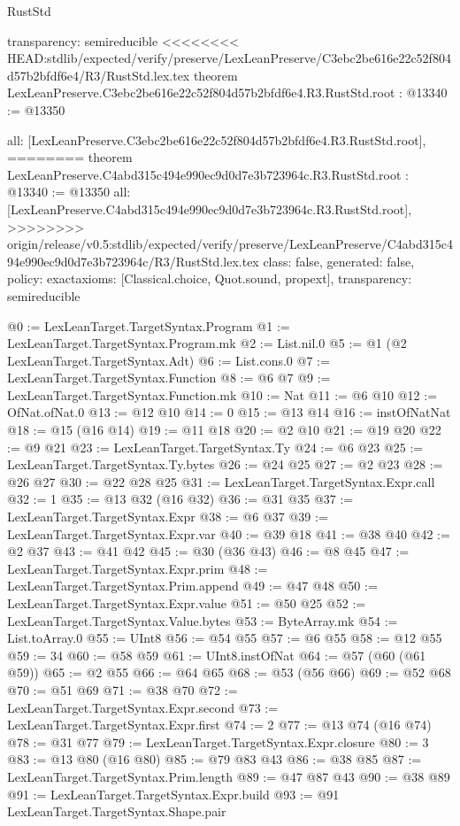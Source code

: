 \begin{lexlean}{RustStd}
\begin{coremodule}
{\begin{coremodule}
{{{{{{{{{{{{{{  transparency: semireducible
}
<<<<<<<< HEAD:stdlib/expected/verify/preserve/LexLeanPreserve/C3ebc2be616e22c52f804d57b2bfdf6e4/R3/RustStd.lex.tex
theorem LexLeanPreserve.C3ebc2be616e22c52f804d57b2bfdf6e4.R3.RustStd.root : @13340 := @13350 {
  all: [LexLeanPreserve.C3ebc2be616e22c52f804d57b2bfdf6e4.R3.RustStd.root],
========
theorem LexLeanPreserve.C4abd315c494e990ec9d0d7e3b723964c.R3.RustStd.root : @13340 := @13350 {
  all: [LexLeanPreserve.C4abd315c494e990ec9d0d7e3b723964c.R3.RustStd.root],
>>>>>>>> origin/release/v0.5:stdlib/expected/verify/preserve/LexLeanPreserve/C4abd315c494e990ec9d0d7e3b723964c/R3/RustStd.lex.tex
  class: false,
  generated: false,
  policy: exact{axioms: [Classical.choice, Quot.sound, propext]},
  transparency: semireducible
}

@0 := LexLeanTarget.TargetSyntax.Program
@1 := LexLeanTarget.TargetSyntax.Program.mk
@2 := List.nil.{0}
@5 := @1 (@2 LexLeanTarget.TargetSyntax.Adt)
@6 := List.cons.{0}
@7 := LexLeanTarget.TargetSyntax.Function
@8 := @6 @7
@9 := LexLeanTarget.TargetSyntax.Function.mk
@10 := Nat
@11 := @6 @10
@12 := OfNat.ofNat.{0}
@13 := @12 @10
@14 := 0
@15 := @13 @14
@16 := instOfNatNat
@18 := @15 (@16 @14)
@19 := @11 @18
@20 := @2 @10
@21 := @19 @20
@22 := @9 @21
@23 := LexLeanTarget.TargetSyntax.Ty
@24 := @6 @23
@25 := LexLeanTarget.TargetSyntax.Ty.bytes
@26 := @24 @25
@27 := @2 @23
@28 := @26 @27
@30 := @22 @28 @25
@31 := LexLeanTarget.TargetSyntax.Expr.call
@32 := 1
@35 := @13 @32 (@16 @32)
@36 := @31 @35
@37 := LexLeanTarget.TargetSyntax.Expr
@38 := @6 @37
@39 := LexLeanTarget.TargetSyntax.Expr.var
@40 := @39 @18
@41 := @38 @40
@42 := @2 @37
@43 := @41 @42
@45 := @30 (@36 @43)
@46 := @8 @45
@47 := LexLeanTarget.TargetSyntax.Expr.prim
@48 := LexLeanTarget.TargetSyntax.Prim.append
@49 := @47 @48
@50 := LexLeanTarget.TargetSyntax.Expr.value
@51 := @50 @25
@52 := LexLeanTarget.TargetSyntax.Value.bytes
@53 := ByteArray.mk
@54 := List.toArray.{0}
@55 := UInt8
@56 := @54 @55
@57 := @6 @55
@58 := @12 @55
@59 := 34
@60 := @58 @59
@61 := UInt8.instOfNat
@64 := @57 (@60 (@61 @59))
@65 := @2 @55
@66 := @64 @65
@68 := @53 (@56 @66)
@69 := @52 @68
@70 := @51 @69
@71 := @38 @70
@72 := LexLeanTarget.TargetSyntax.Expr.second
@73 := LexLeanTarget.TargetSyntax.Expr.first
@74 := 2
@77 := @13 @74 (@16 @74)
@78 := @31 @77
@79 := LexLeanTarget.TargetSyntax.Expr.closure
@80 := 3
@83 := @13 @80 (@16 @80)
@85 := @79 @83 @43
@86 := @38 @85
@87 := LexLeanTarget.TargetSyntax.Prim.length
@89 := @47 @87 @43
@90 := @38 @89
@91 := LexLeanTarget.TargetSyntax.Expr.build
@93 := @91 LexLeanTarget.TargetSyntax.Shape.pair
}}}}}}}}}}}}}}
\end{coremodule}}
\end{coremodule}
\end{lexlean}
